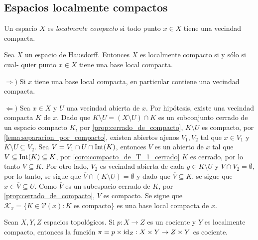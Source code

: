 \subsection{Espacios localmente compactos}
\begin{definicion}
    Un espacio $X$ es \textit{localmente compacto} si todo punto $x\in X$ tiene una vecindad compacta.
\end{definicion}
\begin{prop}
\label{prop:Hausdorff_localmente_compacto}
    Sea $X$ un espacio de Hausdorff. Entonces $X$ es localmente compacto si y sólo si cual- quier punto $x\in X$ tiene una base local compacta.
\end{prop}
\begin{dem}
    $\Rightarrow)$ Si $x$ tiene una base local compacta, en particular contiene una vecindad compacta. 

    $\Leftarrow)$ Sea $x\in X$ y $U$ una vecindad abierta de $x$. Por hipótesis, existe una vecindad compacta $K$ de $x$. Dado que $K\setminus U=(X\setminus U)\cap K$ es un subconjunto cerrado de un espacio compacto $K$, por \ref{prop:cerrado_de_compacto}, $K\setminus U$ es compacto, por \ref{lema:separacion_por_compacto}, existen abiertos ajenos $V_1,V_2$ tal que $x\in V_1$ y $K\setminus U\subseteq V_2$. Sea $V=V_1\cap U\cap \mathrm{Int}(K)$, entonces $V$ es un abierto de $x$ tal que $V\subseteq \mathrm{Int}(K)\subseteq K$, por \ref{coro:compacto_de_T_1_cerrado} $K$ es cerrado, por lo tanto $\overline{V}\subseteq K$. Por otro lado, $V_2$ es vecindad abierta de cada $y\in K\setminus U$ y $V\cap V_2=\emptyset$, por lo tanto, se sigue que $\overline{V}\cap (K\setminus U)=\emptyset$ y dado que $\overline{V}\subseteq K$, se sigue que $x\in\overline{V}\subseteq U$. Como $\overline{V}$ es un subespacio cerrado de $K$, por \ref{prop:cerrado_de_compacto}, $\overline{V}$ es compacto. Se sigue que $\mathcal{K}_x=\{K\in\mathcal{V}(x):K \text{ es compacto}\}$ es una base local compacta de $x$.
\end{dem}
\begin{prop}
\label{prop:producto de cocientes}
    Sean $X,Y,Z$ espacios topológicos. Si $p:X\to Z$ es un cociente y $Y$ es localmente compacto, entonces la función $\pi=p\times \mathrm{id}_Z:X\times Y\to Z\times Y$ es cociente. 
\end{prop}
